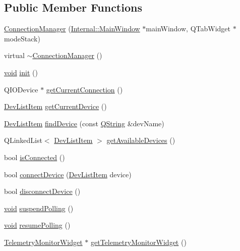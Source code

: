 \subsection*{\-Public \-Member \-Functions}
\begin{DoxyCompactItemize}
\item 
\hyperlink{group___core_plugin_ga45c9149d071d17532d5887d3a64f9cd1}{\-Connection\-Manager} (\hyperlink{class_core_1_1_internal_1_1_main_window}{\-Internal\-::\-Main\-Window} $\ast$main\-Window, \-Q\-Tab\-Widget $\ast$mode\-Stack)
\item 
virtual \hyperlink{group___core_plugin_ga44b4646ef623b71c4a789f3f4213ccbf}{$\sim$\-Connection\-Manager} ()
\item 
\hyperlink{group___u_a_v_objects_plugin_ga444cf2ff3f0ecbe028adce838d373f5c}{void} \hyperlink{group___core_plugin_gab896af0a853749c60a450bf14ce00400}{init} ()
\item 
\-Q\-I\-O\-Device $\ast$ \hyperlink{group___core_plugin_ga85cbf1f53f7086545a446ec224a3143f}{get\-Current\-Connection} ()
\item 
\hyperlink{class_core_1_1_dev_list_item}{\-Dev\-List\-Item} \hyperlink{group___core_plugin_ga93568acf4b301c44a1d9bf243066f3ff}{get\-Current\-Device} ()
\item 
\hyperlink{class_core_1_1_dev_list_item}{\-Dev\-List\-Item} \hyperlink{group___core_plugin_ga7b6178bc28a6457e18586c215a53256b}{find\-Device} (const \hyperlink{group___u_a_v_objects_plugin_gab9d252f49c333c94a72f97ce3105a32d}{\-Q\-String} \&dev\-Name)
\item 
\-Q\-Linked\-List$<$ \hyperlink{class_core_1_1_dev_list_item}{\-Dev\-List\-Item} $>$ \hyperlink{group___core_plugin_ga7527fd84dd3f5fc73130480ab1e45c86}{get\-Available\-Devices} ()
\item 
bool \hyperlink{group___core_plugin_gaa260057af9b250ed953ba1dbe455d71b}{is\-Connected} ()
\item 
bool \hyperlink{group___core_plugin_gae4e29b41f3deb1349c8f21bfe6f6e597}{connect\-Device} (\hyperlink{class_core_1_1_dev_list_item}{\-Dev\-List\-Item} device)
\item 
bool \hyperlink{group___core_plugin_ga679b06064b497205af5453783acff419}{disconnect\-Device} ()
\item 
\hyperlink{group___u_a_v_objects_plugin_ga444cf2ff3f0ecbe028adce838d373f5c}{void} \hyperlink{group___core_plugin_gad4e7e06b9cc1c4720a0bb9202c5dca19}{suspend\-Polling} ()
\item 
\hyperlink{group___u_a_v_objects_plugin_ga444cf2ff3f0ecbe028adce838d373f5c}{void} \hyperlink{group___core_plugin_gaffc78d62ba1226c3d690158e30db4dee}{resume\-Polling} ()
\item 
\hyperlink{class_telemetry_monitor_widget}{\-Telemetry\-Monitor\-Widget} $\ast$ \hyperlink{group___core_plugin_ga161596a57af98c968d8adc57fef40a4b}{get\-Telemetry\-Monitor\-Widget} ()
\end{DoxyCompactItemize}
